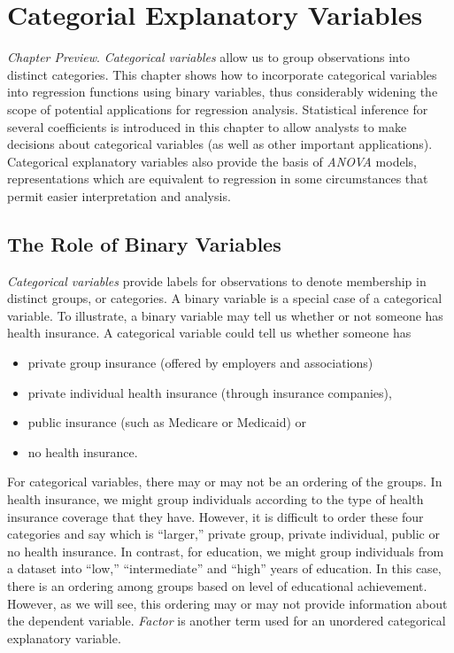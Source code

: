\setcounter{chapter}{3}

\chapter{Categorial Explanatory Variables}


{\small \textit{Chapter Preview}. \textit{Categorical variables}
allow us to group observations into distinct categories. This
chapter shows how to incorporate categorical variables into
regression functions using binary variables, thus considerably
widening the scope of potential applications for regression
analysis. Statistical inference for several coefficients is
introduced in this chapter to allow analysts to make decisions about
categorical variables (as well as other important applications).
Categorical explanatory variables also provide the basis of
\textit{ANOVA} models, representations which are equivalent to
regression in some circumstances that permit easier interpretation
and analysis.}

\section{The Role of Binary Variables}

\textit{Categorical variables} provide labels for observations to
denote membership in distinct groups, or categories. A binary
variable is a special case of a categorical variable. To illustrate,
a binary variable may tell us whether or not someone has health
insurance. A categorical variable could tell us whether someone has
\begin{itemize}
\item private group insurance (offered by employers and
associations) \item private individual health insurance (through
insurance companies), \item public insurance (such as Medicare or
Medicaid) or \item no health insurance.
\end{itemize}

For categorical variables, there may or may not be an ordering of
the groups. In health insurance, we might group individuals
according to the type of health insurance coverage that they have.
However, it is difficult to order these four categories and say
which is ``larger,'' private group, private individual, public or no
health insurance. In contrast, for education, we might group
individuals from a dataset into ``low,'' ``intermediate'' and
``high'' years of education. In this case, there is an ordering
among groups based on level of educational achievement. However, as
we will see, this ordering may or may not provide information about
the dependent variable. \textit{Factor} is another term used for an
unordered categorical explanatory variable.

